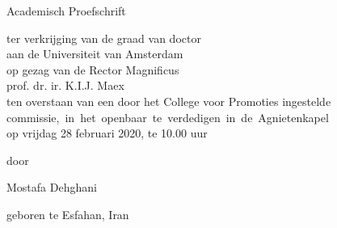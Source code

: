 {%



\clearpage
\par\vskip 2cm
\begin{center}
\printtitle
\par\vspace {6cm}
{\large \sc Academisch Proefschrift}
\par\vspace {1cm}
{\large ter verkrijging van de graad van doctor\\
aan de Universiteit van Amsterdam\\
op gezag van de Rector Magnificus\\
prof. dr. ir. K.I.J. Maex\\                                 %
ten overstaan van een door het College voor Promoties ingestelde\\
\mbox{commissie, in het openbaar te verdedigen in de Agnietenkapel}\\        %
op vrijdag 28 februari 2020, te 10.00 uur \\ }        %
\par\vspace {1cm} {\large door}
\par \vspace {1cm} %
{\Large Mostafa Dehghani}                        %
\par\vspace {1cm} %
{\large geboren te Esfahan, Iran} %
\end{center}

}
